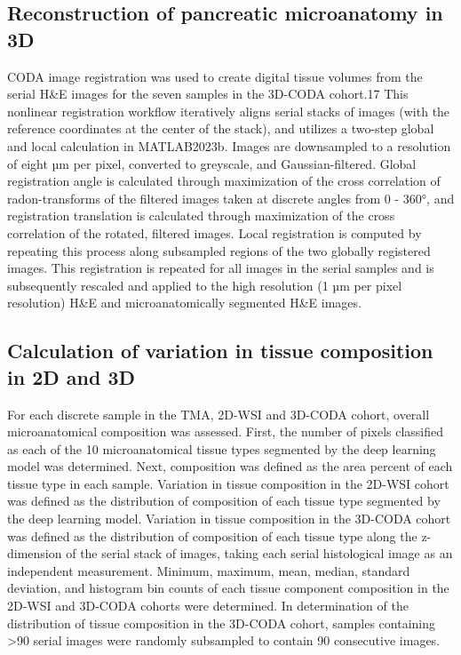 \begin{refsection}
    \subsection{Reconstruction of pancreatic microanatomy in 3D}
    CODA image registration was used to create digital tissue volumes from the serial H\&E images for the seven samples in the 3D-CODA cohort.17 This nonlinear registration workflow iteratively aligns serial stacks of images (with the reference coordinates at the center of the stack), and utilizes a two-step global and local calculation in MATLAB2023b. Images are downsampled to a resolution of eight µm per pixel, converted to greyscale, and Gaussian-filtered. Global registration angle is calculated through maximization of the cross correlation of radon-transforms of the filtered images taken at discrete angles from 0 - 360°, and registration translation is calculated through maximization of the cross correlation of the rotated, filtered images. Local registration is computed by repeating this process along subsampled regions of the two globally registered images. This registration is repeated for all images in the serial samples and is subsequently rescaled and applied to the high resolution (1 µm per pixel resolution) H\&E and microanatomically segmented H\&E images.
    
    \subsection{Calculation of variation in tissue composition in 2D and 3D}
    For each discrete sample in the TMA, 2D-WSI and 3D-CODA cohort, overall microanatomical composition was assessed. First, the number of pixels classified as each of the 10 microanatomical tissue types segmented by the deep learning model was determined. Next, composition was defined as the area percent of each tissue type in each sample. Variation in tissue composition in the 2D-WSI cohort was defined as the distribution of composition of each tissue type segmented by the deep learning model. Variation in tissue composition in the 3D-CODA cohort was defined as the distribution of composition of each tissue type along the z-dimension of the serial stack of images, taking each serial histological image as an independent measurement. Minimum, maximum, mean, median, standard deviation, and histogram bin counts of each tissue component composition in the 2D-WSI and 3D-CODA cohorts were determined. In determination of the distribution of tissue composition in the 3D-CODA cohort, samples containing >90 serial images were randomly subsampled to contain 90 consecutive images.
    

\end{refsection}

